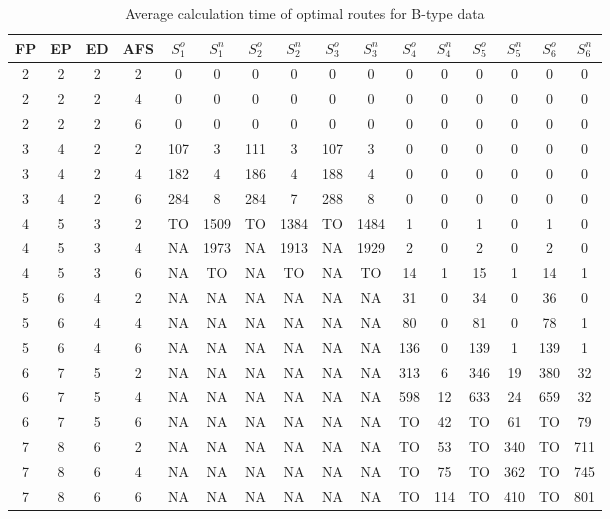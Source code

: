 \begin{longtable}{|c|c|c|c|c c|c c|c c|c c|c c|c c|}
\caption{Average calculation time of optimal routes for B-type data}
\label{tab:avg_time_b} \\
\hline
 FP & EP & ED & AFS & $S^o_1$ & $S^n_1$ & $S^o_2$ & $S^n_2$ & $S^o_3$ & $S^n_3$ & $S^o_4$ & $S^n_4$ & $S^o_5$ & $S^n_5$ & $S^o_6$ & $S^n_6$ \\
\hline\hline
2 & 2 & 2 & 2 & 0 & 0 & 0 & 0 & 0 & 0 & 0 & 0 & 0 & 0 & 0 & 0 \\
\hline
2 & 2 & 2 & 4 & 0 & 0 & 0 & 0 & 0 & 0 & 0 & 0 & 0 & 0 & 0 & 0 \\
\hline
2 & 2 & 2 & 6 & 0 & 0 & 0 & 0 & 0 & 0 & 0 & 0 & 0 & 0 & 0 & 0 \\
\hline
3 & 4 & 2 & 2 & 107 & 3 & 111 & 3 & 107 & 3 & 0 & 0 & 0 & 0 & 0 & 0 \\
\hline
3 & 4 & 2 & 4 & 182 & 4 & 186 & 4 & 188 & 4 & 0 & 0 & 0 & 0 & 0 & 0 \\
\hline
3 & 4 & 2 & 6 & 284 & 8 & 284 & 7 & 288 & 8 & 0 & 0 & 0 & 0 & 0 & 0 \\
\hline
4 & 5 & 3 & 2 & TO & 1509 & TO & 1384 & TO & 1484 & 1 & 0 & 1 & 0 & 1 & 0 \\
\hline
4 & 5 & 3 & 4 & NA & 1973 & NA & 1913 & NA & 1929 & 2 & 0 & 2 & 0 & 2 & 0 \\
\hline
4 & 5 & 3 & 6 & NA & TO & NA & TO & NA & TO & 14 & 1 & 15 & 1 & 14 & 1 \\
\hline
5 & 6 & 4 & 2 & NA & NA & NA & NA & NA & NA & 31 & 0 & 34 & 0 & 36 & 0 \\
\hline
5 & 6 & 4 & 4 & NA & NA & NA & NA & NA & NA & 80 & 0 & 81 & 0 & 78 & 1 \\
\hline
5 & 6 & 4 & 6 & NA & NA & NA & NA & NA & NA & 136 & 0 & 139 & 1 & 139 & 1 \\
\hline
6 & 7 & 5 & 2 & NA & NA & NA & NA & NA & NA & 313 & 6 & 346 & 19 & 380 & 32 \\
\hline
6 & 7 & 5 & 4 & NA & NA & NA & NA & NA & NA & 598 & 12 & 633 & 24 & 659 & 32 \\
\hline
6 & 7 & 5 & 6 & NA & NA & NA & NA & NA & NA & TO & 42 & TO & 61 & TO & 79 \\
\hline
7 & 8 & 6 & 2 & NA & NA & NA & NA & NA & NA & TO & 53 & TO & 340 & TO & 711 \\
\hline
7 & 8 & 6 & 4 & NA & NA & NA & NA & NA & NA & TO & 75 & TO & 362 & TO & 745 \\
\hline
7 & 8 & 6 & 6 & NA & NA & NA & NA & NA & NA & TO & 114 & TO & 410 & TO & 801 \\
\hline
\end{longtable}